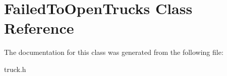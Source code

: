 \hypertarget{class_failed_to_open_trucks}{}\section{Failed\+To\+Open\+Trucks Class Reference}
\label{class_failed_to_open_trucks}


The documentation for this class was generated from the following file\+:\begin{DoxyCompactItemize}
\item 
truck.\+h\end{DoxyCompactItemize}
